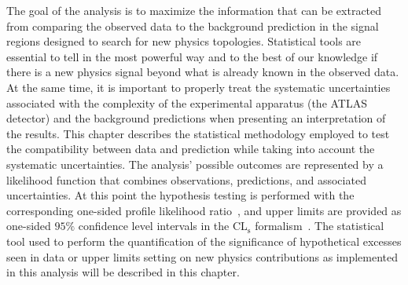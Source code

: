 The goal of the analysis is to maximize the information that can be 
extracted from comparing the observed data to the background 
prediction in the signal regions designed to search for new physics 
topologies. Statistical tools are essential to tell in the most 
powerful way and to the best of our knowledge if there is a new physics 
signal beyond what is already known in the observed data. 
At the same time, it is important to properly treat the systematic 
uncertainties associated with the complexity of the experimental 
apparatus (the ATLAS detector) and the background predictions when 
presenting an interpretation of the results. 
This chapter describes the statistical methodology employed to 
test the compatibility between data and prediction while taking into 
account the systematic uncertainties. 
The analysis' possible outcomes are represented by a likelihood function 
that combines observations, predictions, and associated uncertainties. 
At this point the 
hypothesis testing is performed with the corresponding one-sided profile 
likelihood ratio~\cite{Cowan:2010js}, 
and upper limits are provided as one-sided $95\%$ confidence level intervals in the CL$_\text{s}$ formalism~\cite{Read:2002}. 
The statistical tool used to perform the quantification of the significance 
of hypothetical excesses seen in data
or upper limits setting on new physics contributions as implemented in 
this analysis will be described in this chapter.


